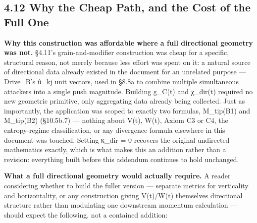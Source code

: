 \documentclass[
]{article}
\begin{document}
\hypertarget{why-the-cheap-path-and-the-cost-of-the-full-one}{%
\subsection{4.12 Why the Cheap Path, and the Cost of the Full
One}\label{why-the-cheap-path-and-the-cost-of-the-full-one}}

\textbf{Why this construction was affordable where a full directional
geometry was not.} §4.11's grain-and-modifier construction was cheap for
a specific, structural reason, not merely because less effort was spent
on it: a natural source of directional data already existed in the
document for an unrelated purpose --- Drive\_B's û\_kj unit vectors,
used in §8.8a to combine multiple simultaneous attackers into a single
push magnitude. Building g\_C(t) and χ\_dir(t) required no new geometric
primitive, only aggregating data already being collected. Just as
importantly, the application was scoped to exactly two formulas,
M\_tip(B1) and M\_tip(B2) (§10.5b.7) --- nothing about V(t), W(t), Axiom
C3 or C4, the entropy-regime classification, or any divergence formula
elsewhere in this document was touched. Setting κ\_dir = 0 recovers the
original undirected mathematics exactly, which is what makes this an
addition rather than a revision: everything built before this addendum
continues to hold unchanged.

\textbf{What a full directional geometry would actually require.} A
reader considering whether to build the fuller version --- separate
metrics for verticality and horizontality, or any construction giving
V(t)/W(t) themselves directional structure rather than modulating one
downstream momentum calculation --- should expect the following, not a
contained addition:
\end{document}
